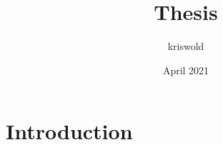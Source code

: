 \documentclass{article}
\title{Thesis}
\author{kriswold }
\date{April 2021}
\begin{document}
\maketitle

\section{Introduction}
\end{document}

